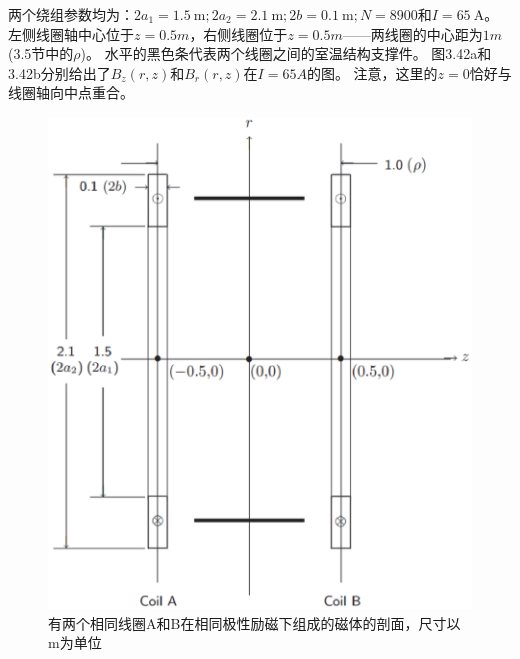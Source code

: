 两个绕组参数均为：$2a_1 = 1.5\ \mathrm{m}; 2a_2 = 2.1\ \mathrm{m}; 2b = 0.1\ \mathrm{m};
N =8900$和$I =65\ \mathrm{A}$。
左侧线圈轴中心位于$z=0.5 m$，右侧线圈位于$z = 0.5 m$——两线圈的中心距为$1 m$ (3.5节中的$\rho$)。
水平的黑色条代表两个线圈之间的室温结构支撑件。
图3.42a和3.42b分别给出了$B_z(r, z)$和$B_r(r, z)$在$I =65 A$的图。
注意，这里的$z=0$恰好与线圈轴向中点重合。
\begin{figure}[htbp]
	\centering
	\includegraphics[scale=0.5]{chpt3/figs/fig3.41.eps}
	\caption{有两个相同线圈A和B在相同极性励磁下组成的磁体的剖面，尺寸以m为单位}
\end{figure}

